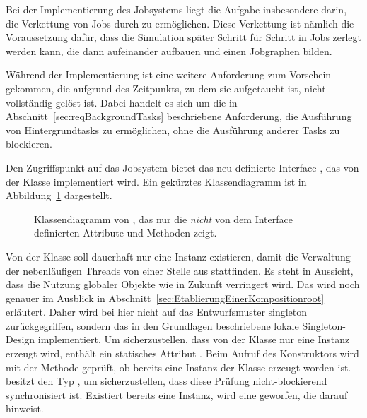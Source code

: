 Bei der Implementierung des Jobsystems liegt die Aufgabe insbesondere darin, die Verkettung von Jobs durch  zu ermöglichen. Diese Verkettung ist nämlich die Voraussetzung dafür, dass die Simulation später Schritt für Schritt in Jobs zerlegt werden kann, die dann aufeinander aufbauen und einen Jobgraphen bilden. 

Während der Implementierung ist eine weitere Anforderung zum Vorschein gekommen, die aufgrund des Zeitpunkts, zu dem sie aufgetaucht ist, nicht vollständig gelöst ist. Dabei handelt es sich um die in Abschnitt~\ref{sec:reqBackgroundTasks} beschriebene Anforderung, die Ausführung von Hintergrundtasks zu ermöglichen, ohne die Ausführung anderer Tasks zu blockieren. 

Den Zugriffspunkt auf das Jobsystem bietet das neu definierte Interface , das von der Klasse  implementiert wird. Ein gekürztes Klassendiagramm ist in Abbildung~\ref{fig:diag-BlocklibExecutor} dargestellt.

\begin{figure}[!htb]
	\centering
	
	\caption[Gekürztes Klassendiagramm von .]{Klassendiagramm von , das nur die \emph{nicht} von dem Interface  definierten Attribute und Methoden zeigt.}\label{fig:diag-BlocklibExecutor}
\end{figure}

Von der Klasse  soll dauerhaft nur eine Instanz existieren, damit die Verwaltung der nebenläufigen Threads von einer Stelle aus stattfinden. Es steht in Aussicht, dass die Nutzung globaler Objekte wie  in Zukunft verringert wird. Das wird noch genauer im Ausblick in Abschnitt~\ref{sec:EtablierungEinerKompositionroot} erläutert. Daher wird bei hier nicht auf das Entwurfsmuster \gls{singleton} zurückgegriffen, sondern das in den Grundlagen beschriebene lokale Singleton-Design implementiert. Um sicherzustellen, dass von der Klasse nur eine Instanz erzeugt wird, enthält  ein statisches Attribut . Beim Aufruf des Konstruktors wird mit der Methode  geprüft, ob bereits eine Instanz der Klasse erzeugt worden ist.  besitzt den Typ , um sicherzustellen, dass diese Prüfung nicht-blockierend synchronisiert ist. Existiert bereits eine Instanz, wird eine  geworfen, die darauf hinweist.

